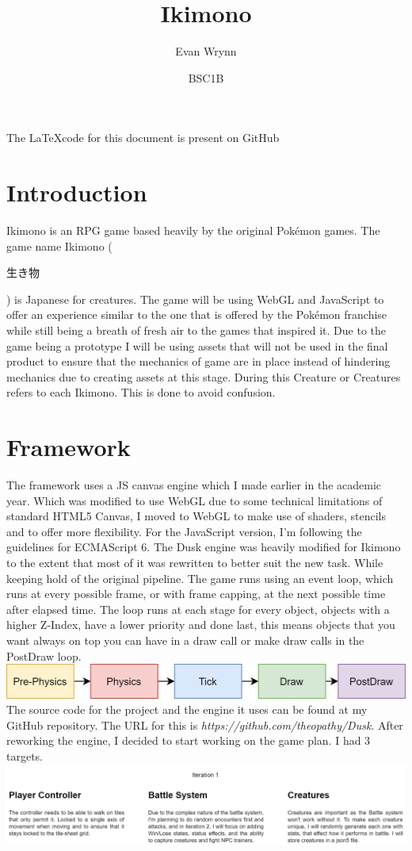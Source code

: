 \documentclass[11pt,a4paper]{article}
\title{Ikimono}
\author{Evan Wrynn }
\date{BSC1B}
\begin{document}
\maketitle
The \LaTeX\space code for this document is present on GitHub 
\section{Introduction}
Ikimono is an RPG game based heavily by the original Pokémon games. The game name Ikimono ( \begin{CJK}{UTF8}{min}生き物\end{CJK} ) is Japanese for creatures. The game will be using WebGL and JavaScript to offer an experience similar to the one that is offered by the Pokémon franchise while still being a breath of fresh air to the games that inspired it. Due to the game being a prototype I will be using assets that will not be used in the final product to ensure that the mechanics of game are in place instead of hindering mechanics due to creating assets at this stage. During this Creature or Creatures refers to each Ikimono. This is done to avoid confusion.


\section{Framework}
The framework uses a JS canvas engine which I made earlier in the academic year. Which was modified to use WebGL due to some technical limitations of standard HTML5 Canvas, I moved to WebGL to make use of shaders, stencils and to offer more flexibility. For the JavaScript version, I'm following the guidelines for ECMAScript 6. The Dusk engine was heavily modified for Ikimono to the extent that most of it was rewritten to better suit the new task. While keeping hold of the original pipeline. The game runs using an event loop, which runs at every possible frame, or with frame capping, at the next possible time after elapsed  time. The loop runs at each stage for every object, objects with a higher Z-Index, have a lower priority and done last, this means objects that you want always on top you can have in a draw call or make draw calls in the PostDraw loop.\newline
\includegraphics[width=\textwidth]{download (1).png}
The source code for the project and the engine it uses can be found at my GitHub repository. The URL for this is \textit{https://github.com/theopathy/Dusk}.
After reworking the engine, I decided to start working on the game plan. I had 3 targets. \newline
\includegraphics[width=\textwidth]{download (3).png}
\end{document}
